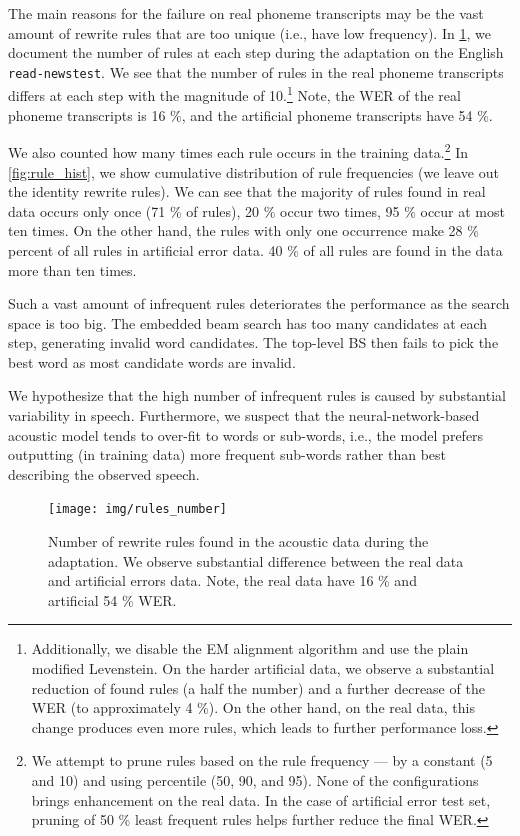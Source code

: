 The main reasons for the failure on real phoneme transcripts may be the vast amount of rewrite rules that are too unique (i.e., have low frequency). In \cref{fig:rule_number}, we document the number of rules at each step during the adaptation on the English \texttt{read-newstest}. We see that the number of rules in the real phoneme transcripts differs at each step with the magnitude of 10.\footnote{Additionally, we disable the EM alignment algorithm and use the plain modified Levenstein. On the harder artificial data, we observe a substantial reduction of found rules (a half the number) and a further decrease of the WER (to approximately 4 \%). On the other hand, on the real data, this change produces even more rules, which leads to further performance loss.} Note, the WER of the real phoneme transcripts is 16 \%, and the artificial phoneme transcripts have 54 \%.

We also counted how many times each rule occurs in the training data.\footnote{We attempt to prune rules based on the rule frequency --- by a constant (5 and 10) and using percentile (50, 90, and 95). None of the configurations brings enhancement on the real data. In the case of artificial error test set, pruning of 50 \% least frequent rules helps further reduce the final WER.} In \cref{fig:rule_hist}, we show cumulative distribution of rule frequencies (we leave out the identity rewrite rules). We can see that the majority of rules found in real data occurs only once (71 \% of rules), 20 \% occur two times, 95 \% occur at most ten times. On the other hand, the rules with only one occurrence make 28 \% percent of all rules in artificial error data. 40 \% of all rules are found in the data more than ten times.

Such a vast amount of infrequent rules deteriorates the performance as the search space is too big. The embedded beam search has too many candidates at each step, generating invalid word candidates. The top-level BS then fails to pick the best word as most candidate words are invalid.

We hypothesize that the high number of infrequent rules is caused by substantial variability in speech. Furthermore, we suspect that the neural-network-based acoustic model tends to over-fit to words or sub-words, i.e., the model prefers outputting (in training data) more frequent sub-words rather than best describing the observed speech. 

\begin{figure}[h]
    \texttt{[image: img/rules\_number]}
    \caption{Number of rewrite rules found in the acoustic data during the adaptation. We observe substantial difference between the real data and artificial errors data. Note, the real data have 16 \% and artificial 54 \% WER.}
    \label{fig:rule_number} 
\end{figure}

